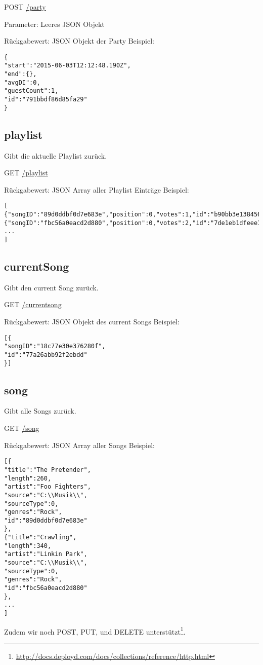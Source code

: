 POST
\url{/party}

Parameter: Leeres JSON Objekt

Rückgabewert: JSON Objekt der Party
Beispiel:
\begin{lstlisting}
{
"start":"2015-06-03T12:12:48.190Z",
"end":{},
"avgDI":0,
"guestCount":1,
"id":"791bbdf86d85fa29"
}
\end{lstlisting}

\subsection{playlist}
\label{service:playlist}
Gibt die aktuelle Playlist zurück.

GET
\url{/playlist}

Rückgabewert: JSON Array aller Playlist Einträge
Beispiel:
\begin{lstlisting}
[
{"songID":"89d0ddbf0d7e683e","position":0,"votes":1,"id":"b90bb3e138456920"},
{"songID":"fbc56a0eacd2d880","position":0,"votes":2,"id":"7de1eb1dfeee188e"},
...
]
\end{lstlisting}


\subsection{currentSong}
\label{service:currentSong}
Gibt den current Song zurück.

GET
\url{/currentsong}

Rückgabewert: JSON Objekt des current Songs
Beispiel:
\begin{lstlisting}
[{
"songID":"18c77e30e376280f",
"id":"77a26abb92f2ebdd"
}]
\end{lstlisting}

\subsection{song}
\label{service:song}
Gibt alle Songs zurück.

GET
\url{/song}

Rückgabewert: JSON Array aller Songs
Beispiel:
\begin{lstlisting}
[{
"title":"The Pretender",
"length":260,
"artist":"Foo Fighters",
"source":"C:\\Musik\\",
"sourceType":0,
"genres":"Rock",
"id":"89d0ddbf0d7e683e"
},
{"title":"Crawling",
"length":340,
"artist":"Linkin Park",
"source":"C:\\Musik\\",
"sourceType":0,
"genres":"Rock",
"id":"fbc56a0eacd2d880"
},
...
]
\end{lstlisting}



Zudem wir noch POST, PUT, und DELETE unterstützt\footnote{\url{http://docs.deployd.com/docs/collections/reference/http.html}}.


